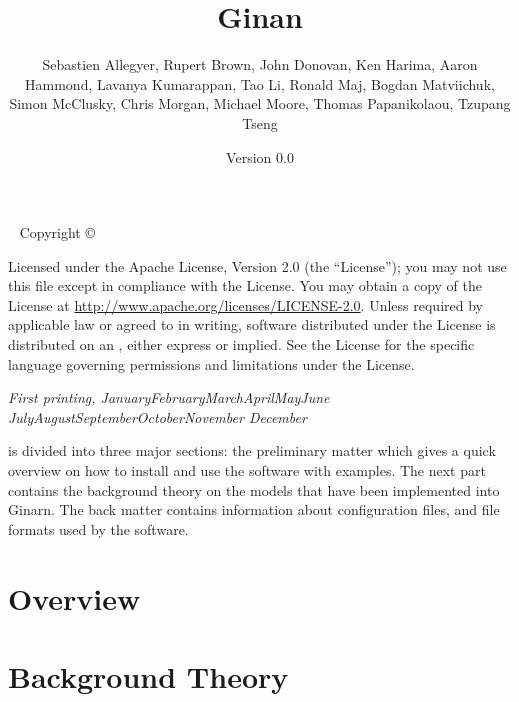 \documentclass[]{tufte-book}
\title{Ginan}
\date{Version 0.0}
\author[The Ginan team]
{Sebastien Allegyer,
Rupert Brown,
John Donovan,
Ken Harima,
Aaron Hammond,
Lavanya Kumarappan,
Tao Li,
Ronald Maj,
Bogdan Matviichuk,
Simon McClusky,
Chris Morgan,
Michael Moore,
Thomas Papanikolaou,
Tzupang Tseng
}
\newcommand{\monthyear}{%
	\ifcase\month\or January\or February\or March\or April\or May\or June\or
	July\or August\or September\or October\or November\or
	December\fi\space\number\year
}
\begin{document}
	
	\frontmatter
	
	\maketitle
	
	
	\newpage
	\begin{fullwidth}
		~\vfill
		\thispagestyle{empty}
		\setlength{\parindent}{0pt}
		\setlength{\parskip}{\baselineskip}
		Copyright \copyright\ \the\year\ \thanklessauthor
		
		\par{}
		
		\par{}
		
		\par Licensed under the Apache License, Version 2.0 (the ``License''); you may not
		use this file except in compliance with the License. You may obtain a copy
		of the License at \url{http://www.apache.org/licenses/LICENSE-2.0}. Unless
		required by applicable law or agreed to in writing, software distributed
		under the License is distributed on an , either express or implied. See the
		License for the specific language governing permissions and limitations
		under the License.
		
		\par\textit{First printing, \monthyear}
	
	 is divided into three major sections: the preliminary matter which gives a quick overview on how to install and use the software with examples. 
	The next part contains the background theory on the models that have been implemented into Ginarn. 
	The back matter contains information about configuration files, and file formats used by the software.
	\listoffigures
	\listoftables
	\cleardoublepage
	\part{Overview}
	
	
	
	
	\mainmatter
	\part{Background Theory}
	
	
	
	
	
	
	\backmatter

\end{fullwidth}
\end{document}
